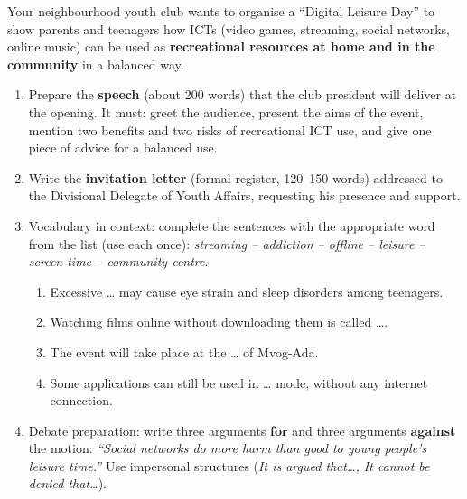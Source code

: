 \documentclass[11pt]{article}
\begin{document}
\begin{exercice}
Your neighbourhood youth club wants to organise a ``Digital Leisure Day'' to show parents and teenagers how ICTs (video games, streaming, social networks, online music) can be used as \textbf{recreational resources at home and in the community} in a balanced way.

\begin{enumerate}
\item Prepare the \textbf{speech} (about 200 words) that the club president will deliver at the opening. It must: greet the audience, present the aims of the event, mention two benefits and two risks of recreational ICT use, and give one piece of advice for a balanced use.
\item Write the \textbf{invitation letter} (formal register, 120--150 words) addressed to the Divisional Delegate of Youth Affairs, requesting his presence and support.
\item Vocabulary in context: complete the sentences with the appropriate word from the list (use each once): \textit{streaming -- addiction -- offline -- leisure -- screen time -- community centre}.
\begin{enumerate}
\item Excessive \ldots{} may cause eye strain and sleep disorders among teenagers.
\item Watching films online without downloading them is called \ldots{}.
\item The event will take place at the \ldots{} of Mvog-Ada.
\item Some applications can still be used in \ldots{} mode, without any internet connection.
\end{enumerate}
\item Debate preparation: write three arguments \textbf{for} and three arguments \textbf{against} the motion: \textit{``Social networks do more harm than good to young people's leisure time.''} Use impersonal structures (\textit{It is argued that\ldots, It cannot be denied that\ldots}).
\end{enumerate}
\end{exercice}
\end{document}
